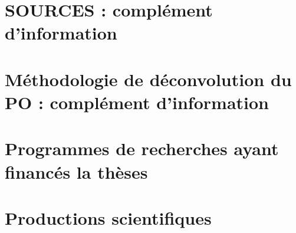 \documentclass[a4paper,11pt]{book}
\begin{document}
\section{\cite{weberComparison2019} SOURCES : complément d'information}
\label{annexe:SOURCES_SI}


\section{\cite{weberApportionment2018} Méthodologie de déconvolution du PO : complément d'information}
\label{annexe:deconvol_OP_SI}


\section{Programmes de recherches ayant financés la thèses}%
\label{annexe:programmes_ayant_financés_la_thèses}

\clearpage

\section{Productions scientifiques}
\label{annexe:CV}





\end{document}
